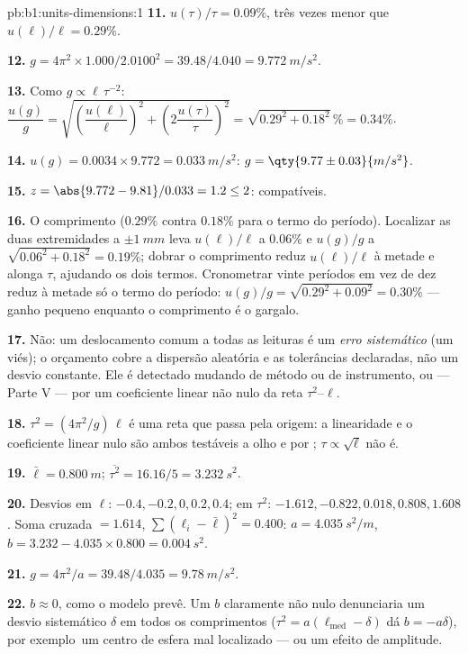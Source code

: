 \begin{solution}{pb:b1:units-dimensions:1}
\textbf{11.} $u(\tau)/\tau = 0.09\%$, três vezes menor que
$u(\ell)/\ell = 0.29\%$.

\textbf{12.} $g = 4\pi^2 \times 1.000/2.0100^2 = 39.48/4.040 =
\qty{9.772}{m/s^2}$.

\textbf{13.} Como $g \propto \ell\,\tau^{-2}$:
$\dfrac{u(g)}{g} = \sqrt{\left(\dfrac{u(\ell)}{\ell}\right)^2
+ \left(2\dfrac{u(\tau)}{\tau}\right)^2} = \sqrt{0.29^2 + 0.18^2}\,\%
= 0.34\%$.

\textbf{14.} $u(g) = 0.0034 \times 9.772 = \qty{0.033}{m/s^2}$:
$g = \qty{9.77\pm0.03}{m/s^2}$.

\textbf{15.} $z = \abs{9.772 - 9.81}/0.033 = 1.2 \leq 2$: compatíveis.

\textbf{16.} O comprimento ($0.29\%$ contra $0.18\%$ para o termo do período).
Localizar as duas extremidades a $\pm\qty{1}{mm}$ leva $u(\ell)/\ell$ a
$0.06\%$ e $u(g)/g$ a $\sqrt{0.06^2 + 0.18^2} = 0.19\%$; dobrar
o comprimento reduz $u(\ell)/\ell$ à metade e alonga $\tau$, ajudando os
dois termos. Cronometrar vinte períodos em vez de dez reduz à metade só o
termo do período: $u(g)/g = \sqrt{0.29^2 + 0.09^2} = 0.30\%$ --- ganho
pequeno enquanto o comprimento é o gargalo.

\textbf{17.} Não: um deslocamento comum a todas as leituras é um
\emph{erro sistemático} (um viés); o orçamento cobre a dispersão aleatória
e as tolerâncias declaradas, não um desvio constante. Ele é detectado
mudando de método ou de instrumento, ou --- Parte V --- por um
coeficiente linear não nulo da reta $\tau^2$--$\ell$.

\textbf{18.} $\tau^2 = (4\pi^2/g)\,\ell$ é uma reta que passa pela
origem: a linearidade e o coeficiente linear nulo são ambos testáveis a
olho e por ; $\tau \propto \sqrt\ell$ não é.

\textbf{19.} $\bar\ell = \qty{0.800}{m}$; $\overline{\tau^2} = 16.16/5 =
\qty{3.232}{s^2}$.

\textbf{20.} Desvios em $\ell$: $-0.4, -0.2, 0, 0.2, 0.4$; em
$\tau^2$: $-1.612, -0.822, 0.018, 0.808, 1.608$. Soma cruzada $= 1.614$,
$\sum(\ell_i - \bar\ell)^2 = 0.400$: $a = \qty{4.035}{s^2/m}$,
$b = 3.232 - 4.035 \times 0.800 = \qty{0.004}{s^2}$.

\textbf{21.} $g = 4\pi^2/a = 39.48/4.035 = \qty{9.78}{m/s^2}$.

\textbf{22.} $b \approx 0$, como o modelo prevê. Um $b$ claramente não
nulo denunciaria um desvio sistemático $\delta$ em todos os comprimentos
($\tau^2 = a(\ell_{\text{med}} - \delta)$ dá $b = -a\delta$), por exemplo\ um
centro de esfera mal localizado --- ou um efeito de amplitude.


\end{solution}
